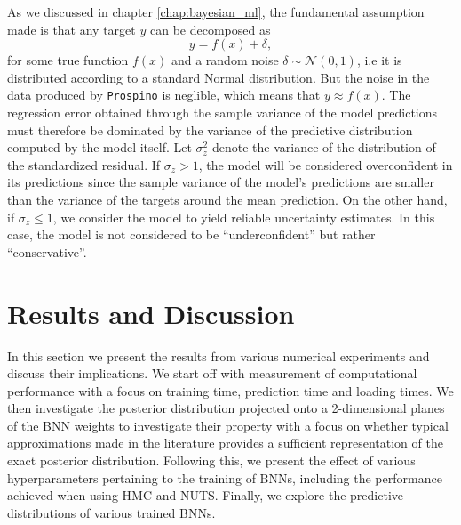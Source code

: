 As we discussed in chapter \ref{chap:bayesian_ml}, the fundamental assumption made is that any target $y$ can be decomposed as
\begin{equation}
    y = f(x) + \delta,
\end{equation}
for some true function $f(x)$ and a random noise $\delta \sim \mathcal{N}(0, 1)$, i.e it is distributed according to a standard Normal distribution. But the noise in the data produced by \texttt{Prospino} is neglible, which means that $y \approx f(x)$. The regression error obtained through the sample variance of the model predictions must therefore be dominated by the variance of the predictive distribution computed by the model itself. Let $\sigma_z^2$ denote the variance of the distribution of the standardized residual. If $\sigma_z > 1$, the model will be considered overconfident in its predictions since the sample variance of the model's predictions are smaller than the variance of the targets around the mean prediction. On the other hand, if $\sigma_z \leq 1$, we consider the model to yield reliable uncertainty estimates. In this case, the model is not considered to be ``underconfident'' but rather ``conservative''.



\section{Results and Discussion}\label{sec:results}
In this section we present the results from various numerical experiments and discuss their implications. We start off with measurement of computational performance with a focus on training time, prediction time and loading times. We then investigate the posterior distribution projected onto a 2-dimensional planes of the BNN weights to investigate their property with a focus on whether typical approximations made in the literature provides a sufficient representation of the exact posterior distribution. Following this, we present the effect of various hyperparameters pertaining to the training of BNNs, including the performance achieved when using HMC and NUTS. Finally, we explore the predictive distributions of various trained BNNs.

